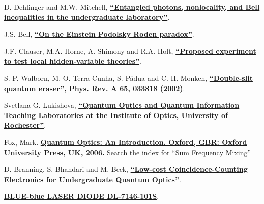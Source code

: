 \documentclass{../lab}
\begin{document}
\begin{thebibliography}{}
\label{sec:References}
    D. Dehlinger and M.W. Mitchell, \href{https://drive.google.com/file/d/1ceyOD6bm-Y9m45tl8NAgvBSIBrnNaHoY/view?usp=drive_link}{\textbf{``Entangled photons, nonlocality, and Bell inequalities in the undergraduate laboratory''}}.

    J.S. Bell, \href{https://drive.google.com/file/d/1DnpfuzoVeRG3AXXw5Ty_7Wz2euoe2uSF/view?usp=drive_link}{\textbf{``On the Einstein Podolsky Roden paradox''}}.

    J.F. Clauser, M.A. Horne, A. Shimony and R.A. Holt, \href{https://drive.google.com/file/d/1pc17oxoxrR5zM3GNXj3JX0NaW6xSFal-/view?usp=drive_link}{\textbf{``Proposed experiment to test local hidden-variable theories''}}.

    S. P. Walborn, M. O. Terra Cunha, S. Pádua and C. H. Monken, \href{https://drive.google.com/file/d/1ua0InY3m-WscKjkZGOgFUsDw433xbWyo/view?usp=drive_link}{\textbf{``Double-slit quantum eraser'', Phys. Rev. A 65, 033818 (2002)}}.
    
    Svetlana G. Lukishova, \href{https://drive.google.com/file/d/1BIyxsls3t6V29_RkZ9iugSKP9Ivd6AaQ/view?usp=drive_link}{\textbf{``Quantum Optics and Quantum Information Teaching Laboratories at the Institute of Optics, University of Rochester''}}.

    Fox, Mark. \href{https://drive.google.com/file/d/1yJGMelI4773M87MNNwGwGwy9sbuptahC/view?usp=drive_link}{\textbf{Quantum Optics: An Introduction.  Oxford, GBR: Oxford University Press, UK, 2006.}} Search the index for ``Sum Frequency Mixing''
    
    D. Branning, S. Bhandari and M. Beck, \href{https://drive.google.com/file/d/1HFmJEl7hay3D3RWPk18n7lHbcv4TxVyE/view?usp=drive_link}{\textbf{``Low-cost Coincidence-Counting Electronics for Undergraduate Quantum Optics''}}.
    
    \href{https://drive.google.com/file/d/1gfUe7tItSHDdwYQpms1lyT17-NDHdg1p/view?usp=drive_link}{\textbf{BLUE-blue LASER DIODE DL-7146-101S}}.
    


\end{thebibliography}
\end{document}
